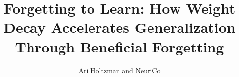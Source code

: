 \documentclass{article}
\title{Forgetting to Learn: How Weight Decay Accelerates Generalization\\Through Beneficial Forgetting}
\author{Ari Holtzman and NeuriCo}
\begin{document}
\maketitle

\begin{abstract}

\end{abstract}










\end{document}
